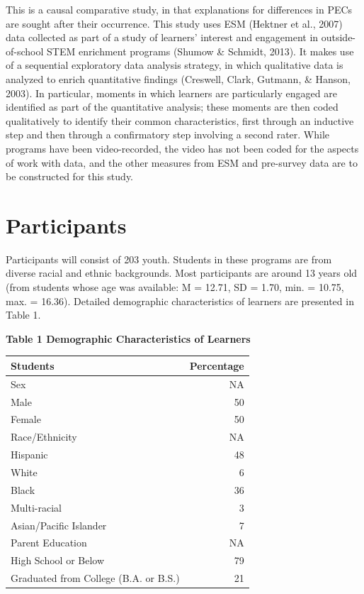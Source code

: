 \documentclass[]{book}
\theoremstyle{definition}
\theoremstyle{definition}
\theoremstyle{definition}
\theoremstyle{remark}
\begin{document}
This is a causal comparative study, in that explanations for differences
in PECs are sought after their occurrence. This study uses ESM (Hektner
et al., 2007) data collected as part of a study of learners' interest
and engagement in outside-of-school STEM enrichment programs (Shumow \&
Schmidt, 2013). It makes use of a sequential exploratory data analysis
strategy, in which qualitative data is analyzed to enrich quantitative
findings (Creswell, Clark, Gutmann, \& Hanson, 2003). In particular,
moments in which learners are particularly engaged are identified as
part of the quantitative analysis; these moments are then coded
qualitatively to identify their common characteristics, first through an
inductive step and then through a confirmatory step involving a second
rater. While programs have been video-recorded, the video has not been
coded for the aspects of work with data, and the other measures from ESM
and pre-survey data are to be constructed for this study.

\section{Participants}\label{participants}

Participants will consist of 203 youth. Students in these programs are
from diverse racial and ethnic backgrounds. Most participants are around
13 years old (from students whose age was available: M = 12.71, SD =
1.70, min. = 10.75, max. = 16.36). Detailed demographic characteristics
of learners are presented in Table 1.

\textbf{Table 1 Demographic Characteristics of Learners}

\begin{tabular}{lr}
\toprule
Students & Percentage\\
\midrule
Sex & NA\\
Male & 50\\
Female & 50\\
Race/Ethnicity & NA\\
Hispanic & 48\\
\addlinespace
White & 6\\
Black & 36\\
Multi-racial & 3\\
Asian/Pacific Islander & 7\\
Parent Education & NA\\
\addlinespace
High School or Below & 79\\
Graduated from College (B.A. or B.S.) & 21\\
\bottomrule
\end{tabular}
\end{document}
